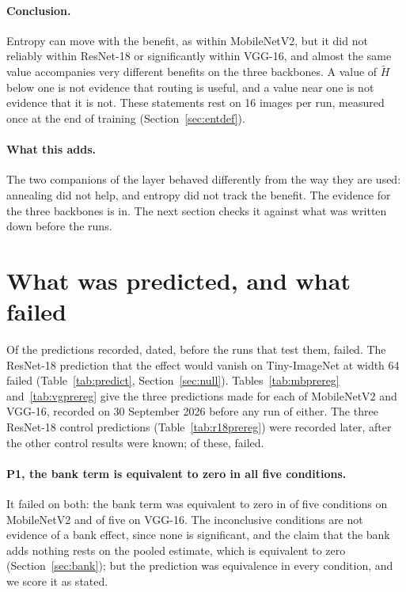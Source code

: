 \documentclass[10pt,a4paper]{article}
\begin{document}
\paragraph{Conclusion.} Entropy can move with the benefit, as within
MobileNetV2, but it did not reliably within ResNet-18 or significantly
within VGG-16, and almost the same value accompanies very different
benefits on the three backbones. A value of
$\tilde H$ below one is not evidence that routing is useful, and a value
near one is not evidence that it is not. These statements rest on 16
images per run, measured once at the end of training
(Section~\ref{sec:entdef}).

\paragraph{What this adds.} The two companions of the layer behaved
differently from the way they are used: annealing did not help, and entropy
did not track the benefit. The evidence for the three
backbones is in. The next section checks it against what was written down before
the runs.

\section{What was predicted, and what failed}\label{sec:prereg}

Of the  predictions recorded, dated, before the runs that test
them,  failed. The ResNet-18 prediction that the effect
would vanish on Tiny-ImageNet at width 64 failed (Table~\ref{tab:predict},
Section~\ref{sec:null}). Tables~\ref{tab:mbprereg} and~\ref{tab:vgprereg}
give the three predictions made for each of MobileNetV2 and VGG-16,
recorded on 30 September 2026 before any run of either. The three ResNet-18
control predictions (Table~\ref{tab:r18prereg}) were recorded later, after the
other control results were known; of these,  failed.

\paragraph{P1, the bank term is equivalent to zero in all five
conditions.} It failed on both: the bank term was equivalent to zero in
 of five conditions on MobileNetV2 and  of five on VGG-16.
The inconclusive conditions are not evidence of a bank effect, since none
is significant, and the claim that the bank adds nothing rests on the pooled estimate, which is
equivalent to zero (Section~\ref{sec:bank}); but the prediction was
equivalence in every condition, and we score it as stated.
\end{document}
